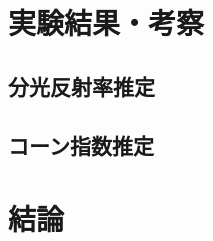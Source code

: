 \documentclass{/workdir/classes/summary}
\begin{document}
\section{実験結果・考察}
\subsection{分光反射率推定}

\subsection{コーン指数推定}

\section{結論}



\end{document}
